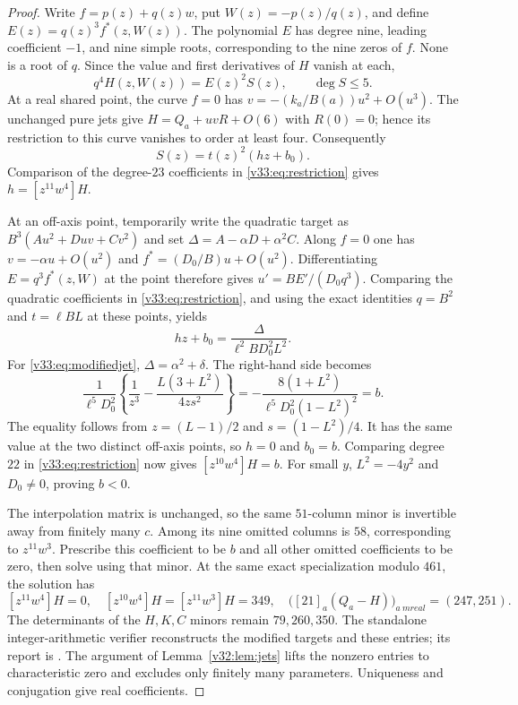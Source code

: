 \documentclass[UTF8,11pt]{ctexart}
\theoremstyle{definition}
\numberwithin{equation}{section}
\begin{document}
\begin{proof}
Write $f=p(z)+q(z)w$, put $W(z)=-p(z)/q(z)$, and define
$E(z)=q(z)^3f^*(z,W(z))$. The polynomial $E$ has degree nine,
leading coefficient $-1$, and nine simple roots, corresponding
to the nine zeros of $f$. None is a root of $q$.
Since the value and first derivatives of $H$ vanish at each,
\begin{equation}\label{v33:eq:restriction}
 q^4H(z,W(z))=E(z)^2S(z),\qquad \deg S\le5.
\end{equation}
At a real shared point, the curve $f=0$ has
$v=-(k_a/B(a))u^2+O(u^3)$. The unchanged pure jets give
$H=Q_a+uvR+O(6)$ with $R(0)=0$; hence its restriction to
this curve vanishes to order at least four. Consequently
\[
 S(z)=t(z)^2(hz+b_0).
\]
Comparison of the degree-$23$ coefficients in
\eqref{v33:eq:restriction} gives $h=[z^{11}w^4]H$.

At an off-axis point, temporarily write the quadratic target
as $B^3(Au^2+Duv+Cv^2)$ and set
$\Delta=A-\alpha D+\alpha^2C$.
Along $f=0$ one has
$v=-\alpha u+O(u^2)$ and $f^*=(D_0/B)u+O(u^2)$.
Differentiating $E=q^3f^*(z,W)$ at the point therefore gives
$u'=BE'/(D_0q^3)$. Comparing the quadratic coefficients in
\eqref{v33:eq:restriction}, and using the exact identities
$q=B^2$ and $t=\ell BL$ at these points, yields
\begin{equation}\label{v33:eq:cornerformula}
 hz+b_0=\frac{\Delta}{\ell^2BD_0^2L^2}.
\end{equation}
For \eqref{v33:eq:modifiedjet}, $\Delta=\alpha^2+\delta$.
The right-hand side becomes
\[
 \frac1{\ell^5D_0^2}
 \left\{\frac1{z^3}-\frac{L(3+L^2)}{4zs^2}\right\}
 =-\frac{8(1+L^2)}{\ell^5D_0^2(1-L^2)^2}=b.
\]
The equality follows from $z=(L-1)/2$ and $s=(1-L^2)/4$.
It has the same value at the two distinct off-axis points, so
$h=0$ and $b_0=b$. Comparing degree $22$ in
\eqref{v33:eq:restriction} now gives $[z^{10}w^4]H=b$.
For small $y$, $L^2=-4y^2$ and $D_0\ne0$, proving $b<0$.

The interpolation matrix is unchanged, so the same $51$-column
minor is invertible away from finitely many $c$. Among its nine
omitted columns is $58$, corresponding to $z^{11}w^3$.
Prescribe this coefficient to be $b$ and all other omitted
coefficients to be zero, then solve using that minor.
At the same exact specialization modulo $461$, the solution has
\begin{equation}\label{v33:eq:certificate}
 [z^{11}w^4]H=0,\quad
 [z^{10}w^4]H=[z^{11}w^3]H=349,\quad
 \bigl([21]_a(Q_a-H)\bigr)_{a\ {
m real}}=(247,251).
\end{equation}
The determinants of the $H,K,C$ minors remain $79,260,350$.
The standalone integer-arithmetic verifier
 reconstructs the modified
targets and these entries; its report is
.
The argument of Lemma~\ref{v32:lem:jets} lifts the nonzero
entries to characteristic zero and excludes only finitely many
parameters. Uniqueness and conjugation give real coefficients.
\end{proof}
\end{document}
